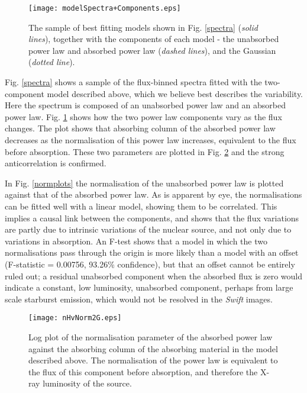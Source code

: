 \documentclass[useAMS,usenatbib]{sam}
\begin{document}
 \begin{figure}
	\texttt{[image: modelSpectra+Components.eps]}
	\caption{The sample of best fitting models shown in Fig. \ref{spectra} ({\it solid lines}), together with the components of each model - the unabsorbed power
	law and absorbed power law ({\it dashed lines}), and the Gaussian ({\it dotted line}).}
	\label{modelSpectra}
\end{figure} 
 

Fig. \ref{spectra} shows a sample of the flux-binned spectra fitted with the two-component model described above, which we believe best describes the variability.  Here
the spectrum is composed of an unabsorbed power law and an absorbed power law. Fig. \ref{modelSpectra} shows how the two power law components vary as the flux changes.
The plot shows that absorbing column of the absorbed power law decreases as the normalisation of this power law increases, equivalent to the flux before absorption. These
two parameters are plotted in Fig. \ref{nhplots} and the strong anticorrelation is confirmed. 

In Fig. \ref{normplots} the normalisation of the unabsorbed power law is plotted against that of the absorbed power law. As is apparent by eye, the normalisations can be
fitted well with a linear model, showing them to be correlated. This implies a causal link between the components, and shows that the flux variations
are partly due to intrinsic variations of the nuclear source, and not only due to variations in absorption. An F-test shows that a model in which the two
normalisations pass through the origin is more likely than a model with an offset (F-statistic = 0.00756, 93.26\% confidence), but that an offset cannot be entirely ruled
out; a residual unabsorbed component when the absorbed flux is zero would indicate a constant, low luminosity, unabsorbed component, perhaps from large scale starburst
emission, which would not be resolved in the {\it Swift} images.



\begin{figure}
	
	\texttt{[image: nHvNorm2G.eps]}\hspace{1pt}
	\caption{Log plot of the normalisation parameter of the absorbed power law 
		against the absorbing column of the absorbing material in
		the model described above. The normalisation of the power law is equivalent to the flux
		of this component before absorption, and therefore the X-ray luminosity of the source.}
	
	\label{nhplots}
\end{figure}  
		
\end{document}
